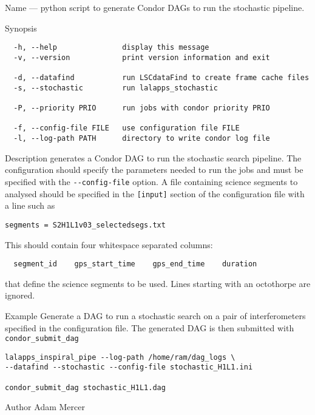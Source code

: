 \begin{entry}
\item[Name]
 --- python script to generate Condor DAGs
to run the stochastic pipeline.

\item[Synopsis]
\begin{verbatim}
  -h, --help               display this message
  -v, --version            print version information and exit

  -d, --datafind           run LSCdataFind to create frame cache files
  -s, --stochastic         run lalapps_stochastic

  -P, --priority PRIO      run jobs with condor priority PRIO

  -f, --config-file FILE   use configuration file FILE
  -l, --log-path PATH      directory to write condor log file
\end{verbatim}

\item[Description]  generates a Condor DAG
to run the stochastic search pipeline. The configuration should specify
the parameters needed to run the jobs and must be specified with the
\verb$--config-file$ option. A file containing science segments to
analysed should be specified in the \verb$[input]$ section of the
configuration file with a line such as
\begin{verbatim}
segments = S2H1L1v03_selectedsegs.txt
\end{verbatim}
This should contain four whitespace separated columns:
\begin{verbatim}
  segment_id    gps_start_time    gps_end_time    duration
\end{verbatim}
that define the science segments to be used. Lines starting with an
octothorpe are ignored.

\item[Example]
Generate a DAG to run a stochastic search on a pair of interferometers
specified in the configuration file. The generated DAG is then submitted
with \texttt{condor\_submit\_dag}
\begin{verbatim}
lalapps_inspiral_pipe --log-path /home/ram/dag_logs \
--datafind --stochastic --config-file stochastic_H1L1.ini

condor_submit_dag stochastic_H1L1.dag
\end{verbatim}

\item[Author]
Adam Mercer
\end{entry}

